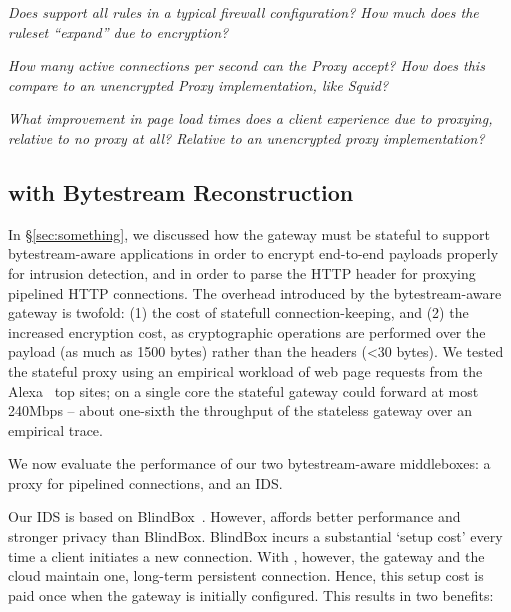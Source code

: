 {\it Does \sys support all rules in a typical firewall configuration? How much does the ruleset ``expand'' due to encryption?}



{\it How many active connections per second can the Proxy accept? How does this compare to an unencrypted Proxy implementation, like Squid?}

{\it What improvement in page load times does a client experience due to proxying, relative to no proxy at all? Relative to an unencrypted proxy implementation?}



\subsection{\sys with Bytestream Reconstruction}
In \S\ref{sec:something}, we discussed how the \sys gateway must be stateful to support bytestream-aware applications in order to encrypt end-to-end payloads properly for intrusion detection, and in order to parse the HTTP header for proxying pipelined HTTP connections. 
The overhead introduced by the bytestream-aware gateway is twofold: (1) the cost of statefull connection-keeping, and (2) the increased encryption cost, as cryptographic operations are performed over the payload (as much as 1500 bytes) rather than the headers (<30 bytes).
We tested the stateful proxy using an empirical workload of web page requests from the Alexa~\cite{alexa} top sites; on a single core the stateful gateway could forward at most 240Mbps -- about one-sixth the throughput of the stateless gateway over an empirical trace. 

We now evaluate the performance of our two bytestream-aware middleboxes: a proxy for pipelined connections, and an IDS.

Our IDS is based on BlindBox~\cite{blindbox}. However, \sys affords better performance and stronger privacy than BlindBox. BlindBox incurs a substantial `setup cost' every time a client initiates a new connection. With \sys, however, the gateway and the cloud maintain one, long-term persistent connection. 
Hence, this setup cost is paid once when the gateway is initially configured. This results in two benefits:

